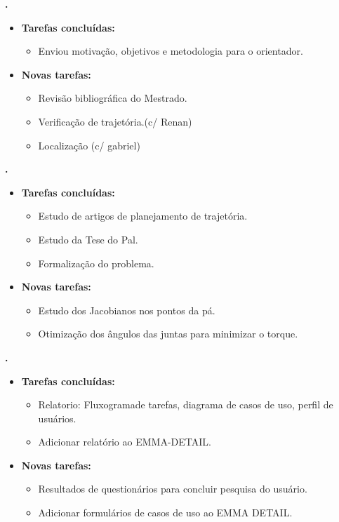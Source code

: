 	
	  \textbf{\elael.} 
	\begin{itemize}
		\item \textbf{Tarefas concluídas:}
			\begin{itemize}    
				\item Enviou motivação, objetivos e metodologia para o orientador.
			\end{itemize}
		
		\item \textbf{Novas tarefas:}
			\begin{itemize} 
			    \item Revisão bibliográfica do Mestrado.
			    \item Verificação de trajetória.(c/ Renan)
			    \item Localização (c/ gabriel)
			\end{itemize}
	\end{itemize}			
			
  \textbf{\renan.} 
	\begin{itemize}
		\item \textbf{Tarefas concluídas:}
			\begin{itemize}    
				\item Estudo de artigos de planejamento de trajetória.
				\item Estudo da Tese do Pal.
				\item Formalização do problema.
			\end{itemize}
		
		\item \textbf{Novas tarefas:}
			\begin{itemize} 
			    \item Estudo dos Jacobianos nos pontos da pá.
			    \item Otimização dos ângulos das juntas para minimizar o torque.
			\end{itemize}
	\end{itemize}	
			
   \textbf{\julia.} 
	\begin{itemize}
		\item \textbf{Tarefas concluídas:}
			\begin{itemize}    
				\item Relatorio: Fluxogramade tarefas, diagrama de casos de uso, perfil de
				usuários.
				\item Adicionar relatório ao EMMA-DETAIL.
			\end{itemize}
		
		\item \textbf{Novas tarefas:}
			\begin{itemize} 
			    \item Resultados de questionários para concluir pesquisa do usuário.
			    \item Adicionar formulários de casos de uso ao EMMA DETAIL.
			\end{itemize}
	\end{itemize}		



